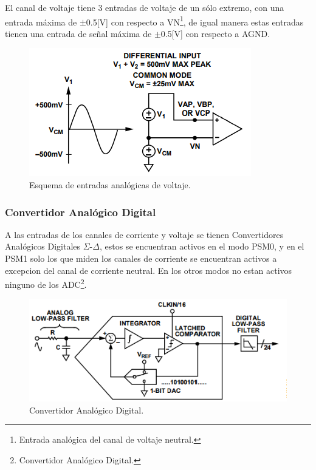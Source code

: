 \documentclass[letterpaper,12pt,oneside]{book}
\begin{document}
				El canal de voltaje tiene 3 entradas de voltaje de un sólo extremo, con una entrada máxima de  $\pm$0.5[V] con respecto a VN\footnote{Entrada analógica del canal de voltaje neutral.},
				de igual manera estas entradas tienen una entrada de señal máxima de $\pm$0.5[V] con respecto a AGND.

				\begin{figure}[!htpb]
					\centering
					\includegraphics[scale = 0.8]{Material de Consulta/EntAnVlt.PNG}
					\caption[Entradas analógicas de Voltaje]{Esquema de entradas analógicas de voltaje.}
					\label{EntVolt}
				\end{figure}

				\subsubsection{Convertidor Analógico Digital}
				A las entradas de los canales de corriente y voltaje se tienen Convertidores Analógicos Digitales $\Sigma$-$\Delta$, estos se encuentran activos en el modo PSM0, y en el PSM1 solo los que miden los canales de corriente se encuentran activos a excepcion del canal de corriente neutral. En los otros modos no estan activos ninguno de los ADC\footnote{Convertidor Analógico Digital.}.

				\begin{figure}[!htpb]
					\centering
					\includegraphics[scale = 0.8]{Material de Consulta/ADC_SigDel.PNG}
					\caption[Convertidor Analógico Digital]{Convertidor Analógico Digital.}
					\label{ADCSigDel}
				\end{figure}
\end{document}
